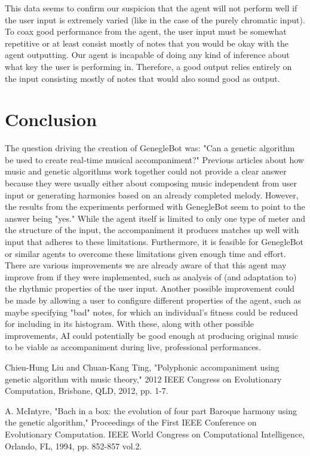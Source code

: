 \documentclass[conference]{IEEEtran}
\begin{document}
This data seems to confirm our suspicion that the agent will not perform well if the user input is extremely varied (like in the case of the purely chromatic input). To coax good performance from the agent, the user input must be somewhat repetitive or at least consist mostly of notes that you would be okay with the agent outputting. Our agent is incapable of doing any kind of inference about what key the user is performing in. Therefore, a good output relies entirely on the input consisting mostly of notes that would also sound good as output.





\section{Conclusion}

The question driving the creation of GenegleBot was: "Can a genetic algorithm be used to create real-time musical accompaniment?" Previous articles about how music and genetic algorithms work together could not provide a clear answer because they were usually either about composing music independent from user input or generating harmonies based on an already completed melody.  However, the results from the experiments performed with GenegleBot seem to point to the answer being "yes."  While the agent itself is limited to only one type of meter and the structure of the input, the accompaniment it produces matches up well with input that adheres to these limitations.  Furthermore, it is feasible for GenegleBot or similar agents to overcome these limitations given enough time and effort. There are various improvements we are already aware of that this agent may improve from if they were implemented, such as analysis of (and adaptation to) the rhythmic properties of the user input. Another possible improvement could be made by allowing a user to configure different properties of the agent, such as maybe specifying "bad" notes, for which an individual's fitness could be reduced for including in its histogram. With these, along with other possible improvements, AI could potentially be good enough at producing original music to be viable as accompaniment during live, professional performances.

\begin{thebibliography}{1}
	
	Chien-Hung Liu and Chuan-Kang Ting, "Polyphonic accompaniment using genetic algorithm with music theory," 2012 IEEE Congress on Evolutionary Computation, Brisbane, QLD, 2012, pp. 1-7.
		
	A. McIntyre, "Bach in a box: the evolution of four part Baroque harmony using the genetic algorithm," Proceedings of the First IEEE Conference on Evolutionary Computation. IEEE World Congress on Computational Intelligence, Orlando, FL, 1994, pp. 852-857 vol.2.
			
	
	
\end{thebibliography}

	
\end{document}
